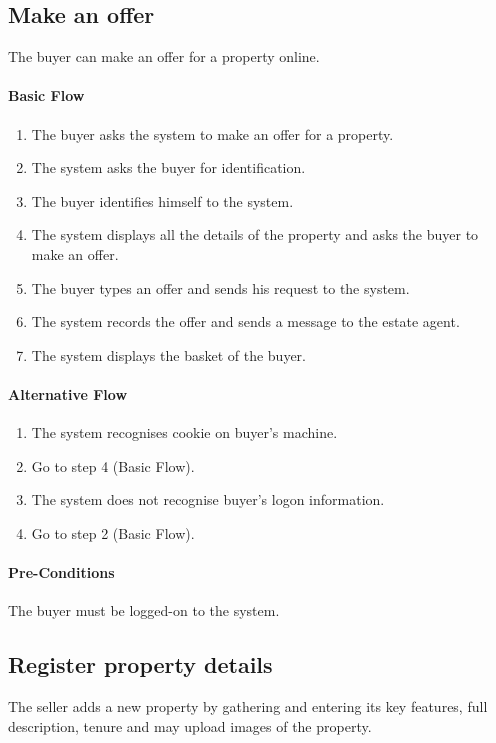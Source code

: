 \documentclass[a4paper,12pt]{article}
\begin{document}
\subsection{Make an offer}
The buyer can make an offer for a property online.
\paragraph{Basic Flow}
\begin{enumerate}
\item The buyer asks the system to make an offer for a property.
\item The system asks the buyer for identification.
\item The buyer identifies himself to the system.
\item The system displays all the details of the property and asks the buyer to make an offer.
\item The buyer types an offer and sends his request to the system.
\item The system records the offer and sends a message to the estate agent.
\item The system displays the basket of the buyer.
\end{enumerate}
\paragraph{Alternative Flow}
\begin{enumerate}
\item The system recognises cookie on buyer's machine.
\item Go to step 4 (Basic Flow).
\item The system does not recognise buyer's logon information.
\item Go to step 2 (Basic Flow).
\end{enumerate}
\paragraph{Pre-Conditions}
The buyer must be logged-on to the system.

\subsection{Register property details}
The seller adds a new property by gathering and entering its key features, full description, tenure and may upload images of the property.
\end{document}
